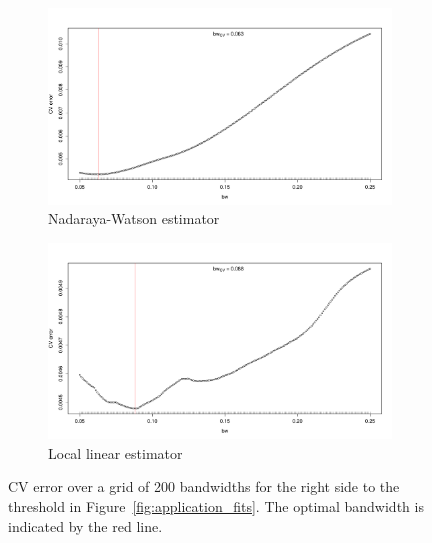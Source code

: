 \documentclass[a4paper, 12pt]{scrartcl}
\begin{document}
\begin{figure}
	\centering
	\begin{subfigure}{\textwidth}
		\centering
		\includegraphics[trim=0 0 20 45, clip, width=\textwidth]{application_figure_04a.pdf}
		\caption{Nadaraya-Watson estimator}
		\label{fig:application_right_nw}
	\end{subfigure}

	\begin{subfigure}{\textwidth}
		\centering
		\includegraphics[trim=0 0 20 45, clip, width=\textwidth]{application_figure_04b.pdf}
		\caption{Local linear estimator}
		\label{fig:application_right_ll}
	\end{subfigure}
	\caption{CV error over a grid of 200 bandwidths for the right side to the threshold in Figure~\ref{fig:application_fits}.
			 The optimal bandwidth is indicated by the red line.}
	\label{fig:application_right}
\end{figure}
\end{document}
